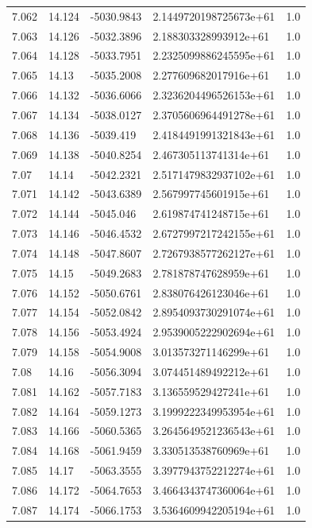 \begin{tabular}{lllll}
7.062 & 14.124 & -5030.9843 & 2.1449720198725673e+61 & 1.0 \\
7.063 & 14.126 & -5032.3896 & 2.188303328993912e+61 & 1.0 \\
7.064 & 14.128 & -5033.7951 & 2.2325099886245595e+61 & 1.0 \\
7.065 & 14.13 & -5035.2008 & 2.277609682017916e+61 & 1.0 \\
7.066 & 14.132 & -5036.6066 & 2.3236204496526153e+61 & 1.0 \\
7.067 & 14.134 & -5038.0127 & 2.3705606964491278e+61 & 1.0 \\
7.068 & 14.136 & -5039.419 & 2.4184491991321843e+61 & 1.0 \\
7.069 & 14.138 & -5040.8254 & 2.467305113741314e+61 & 1.0 \\
7.07 & 14.14 & -5042.2321 & 2.5171479832937102e+61 & 1.0 \\
7.071 & 14.142 & -5043.6389 & 2.567997745601915e+61 & 1.0 \\
7.072 & 14.144 & -5045.046 & 2.619874741248715e+61 & 1.0 \\
7.073 & 14.146 & -5046.4532 & 2.6727997217242155e+61 & 1.0 \\
7.074 & 14.148 & -5047.8607 & 2.7267938577262127e+61 & 1.0 \\
7.075 & 14.15 & -5049.2683 & 2.781878747628959e+61 & 1.0 \\
7.076 & 14.152 & -5050.6761 & 2.838076426123046e+61 & 1.0 \\
7.077 & 14.154 & -5052.0842 & 2.8954093730291074e+61 & 1.0 \\
7.078 & 14.156 & -5053.4924 & 2.9539005222902694e+61 & 1.0 \\
7.079 & 14.158 & -5054.9008 & 3.013573271146299e+61 & 1.0 \\
7.08 & 14.16 & -5056.3094 & 3.074451489492212e+61 & 1.0 \\
7.081 & 14.162 & -5057.7183 & 3.136559529427241e+61 & 1.0 \\
7.082 & 14.164 & -5059.1273 & 3.1999222349953954e+61 & 1.0 \\
7.083 & 14.166 & -5060.5365 & 3.2645649521236543e+61 & 1.0 \\
7.084 & 14.168 & -5061.9459 & 3.330513538760969e+61 & 1.0 \\
7.085 & 14.17 & -5063.3555 & 3.3977943752212274e+61 & 1.0 \\
7.086 & 14.172 & -5064.7653 & 3.4664343747360064e+61 & 1.0 \\
7.087 & 14.174 & -5066.1753 & 3.5364609942205194e+61 & 1.0 \\

\end{tabular}
